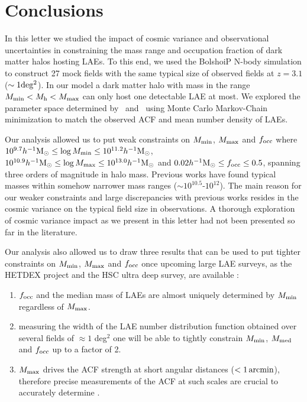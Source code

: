 \documentclass{emulateapj}
\newcommand{\hMsun}{{\ifmmode{h^{-1}{\rm {M_{\odot}}}}\else{$h^{-1}{\rm{M_{\odot}}}$}\fi}}
\newcommand{\mmin}{{\ifmmode{{M_{\rm min}}}\else{${M_{\rm min}}$}\fi}}
\newcommand{\mmax}{{\ifmmode{{M_{\rm max}}}\else{${M_{\rm max}}$}\fi}}
\begin{document}
\section{Conclusions}

In this letter we studied the impact of cosmic variance and observational uncertainties in constraining the mass range and  occupation fraction of dark matter halos hosting  LAEs.  
To this end, we used the BolshoiP N-body simulation to construct  27 mock fields  with the same typical size  of observed fields at  $z=3.1$ ($\sim 1 {\rm deg^2}$).  
In our model a dark matter halo with mass in the range $M_{\rm min}<M_{\mathrm h}<M_{\rm   max}$ can only host one detectable LAE at most. 
We explored the parameter space determined by \mmin\ and \mmax\ using Monte Carlo Markov-Chain minimization to match the observed  ACF and mean number density of LAEs. 

Our analysis allowed us to put weak constraints on $M_{\rm min}$, $M_{\rm max}$ and $f_{\rm occ}$ where $10^{9.7}\hMsun\leq \log M_{\rm min}\leq 10^{11.2}\hMsun$, $10^{10.9}\hMsun\leq \log M_{\rm max}\leq 10^{13.0}\hMsun$ and $0.02\hMsun\leq f_{\rm occ}\leq 0.5$, spanning three orders of magnitude in halo mass.
Previous works\citep{Hayashino2004, Gawiser07,Ouchi2008,Bielby16} have found typical masses within somehow narrower mass ranges ($\sim 10^{10.5}$-$10^{12}$).  
The main reason for our weaker constraints and large discrepancies with previous works resides in the cosmic variance on the typical field size in observations. 
A thorough exploration of cosmic variance impact as we present in this letter had not been presented so far in the literature.

Our analysis also allowed us to draw three results that can be used to put tighter constraints on $M_{\rm min}$, $M_{\rm max}$ and $f_{\rm occ}$ once upcoming large LAE surveys, as the HETDEX project \citep{Hetdex2011} and the HSC ultra deep survey, are available :
\begin{enumerate}
\item $f_{\rm occ}$ and the median mass of LAEs are almost uniquely determined by $M_{\rm min}$ regardless of $M_{\rm max}$. \item measuring the width of the LAE number distribution function obtained over several fields of $\approx 1$ deg$^2$ one will be able to tightly constrain  $M_{\rm min}$, $M_{\rm med}$ and $f_{\rm occ}$ up to a factor of  2. 
\item  $M_{\rm max}$ drives the ACF strength at short angular distances ($<1\,\rm arcmin$), therefore precise measurements of the ACF at such scales are crucial to accurately determine \mmax.
\end{enumerate}
\end{document}
